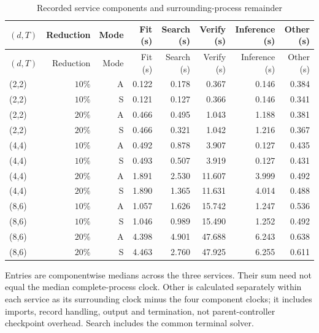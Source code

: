 \begingroup\footnotesize\setlength{\tabcolsep}{3pt}
\begin{longtable}{lrrrrrrr}
\caption{Recorded service components and surrounding-process remainder}\label{tab:components59}\\
\hline
$(d,T)$ & Reduction & Mode & Fit (s) & Search (s) & Verify (s) & Inference (s) & Other (s) \\
\hline
\endfirsthead
$(d,T)$ & Reduction & Mode & Fit (s) & Search (s) & Verify (s) & Inference (s) & Other (s) \\
\hline
\endhead
(2,2) & $10\%$ & A & 0.122 & 0.178 & 0.367 & 0.146 & 0.384 \\
(2,2) & $10\%$ & S & 0.121 & 0.127 & 0.366 & 0.146 & 0.341 \\
(2,2) & $20\%$ & A & 0.466 & 0.495 & 1.043 & 1.188 & 0.381 \\
(2,2) & $20\%$ & S & 0.466 & 0.321 & 1.042 & 1.216 & 0.367 \\
(4,4) & $10\%$ & A & 0.492 & 0.878 & 3.907 & 0.127 & 0.435 \\
(4,4) & $10\%$ & S & 0.493 & 0.507 & 3.919 & 0.127 & 0.431 \\
(4,4) & $20\%$ & A & 1.891 & 2.530 & 11.607 & 3.999 & 0.492 \\
(4,4) & $20\%$ & S & 1.890 & 1.365 & 11.631 & 4.014 & 0.488 \\
(8,6) & $10\%$ & A & 1.057 & 1.626 & 15.742 & 1.247 & 0.536 \\
(8,6) & $10\%$ & S & 1.046 & 0.989 & 15.490 & 1.252 & 0.492 \\
(8,6) & $20\%$ & A & 4.398 & 4.901 & 47.688 & 6.243 & 0.638 \\
(8,6) & $20\%$ & S & 4.463 & 2.760 & 47.925 & 6.255 & 0.611 \\
\hline\end{longtable}
\noindent Entries are componentwise medians across the three services. Their sum need not equal the median complete-process clock. Other is calculated separately within each service as its surrounding clock minus the four component clocks; it includes imports, record handling, output and termination, not parent-controller checkpoint overhead. Search includes the common terminal solver.
\endgroup
